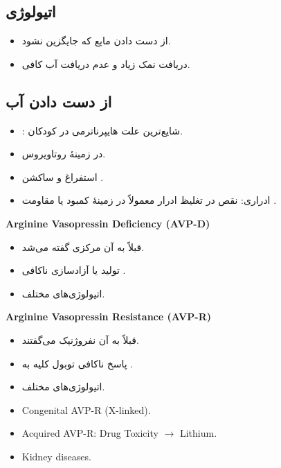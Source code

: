 \documentclass[12pt,a4paper]{article}
\begin{document}
\subsection*{اتیولوژی}
\begin{itemize}
\item از دست دادن مایع که جایگزین نشود.
\item دریافت نمک زیاد و عدم دریافت آب کافی.
\end{itemize}

\subsection*{از دست دادن آب}
\begin{itemize}
\item {}: شایع‌ترین علت هایپرناترمی در کودکان.
\item {} در زمینهٔ روتاویروس.
\item استفراغ و ساکشن .
\item ادراری: نقص در تغلیظ ادرار معمولاً در زمینهٔ کمبود یا مقاومت .
\end{itemize}
\begin{latin}
\textbf{Arginine Vasopressin Deficiency (AVP-D)}
\end{latin}
\begin{itemize}
\item قبلاً به آن  مرکزی گفته می‌شد.
\item تولید یا آزادسازی ناکافی .
\item اتیولوژی‌های مختلف.
\end{itemize}
\begin{latin}
\textbf{Arginine Vasopressin Resistance (AVP-R)}
\end{latin}
\begin{itemize}
\item قبلاً به آن  نفروژنیک می‌گفتند.
\item پاسخ ناکافی توبول کلیه به .
\item اتیولوژی‌های مختلف.
\end{itemize}
\begin{latin}
\begin{itemize}
\item Congenital AVP-R (X-linked).
\item Acquired AVP-R: Drug Toxicity \(\longrightarrow\) Lithium.
\item Kidney diseases.
\end{itemize}
\end{latin}
\end{document}
